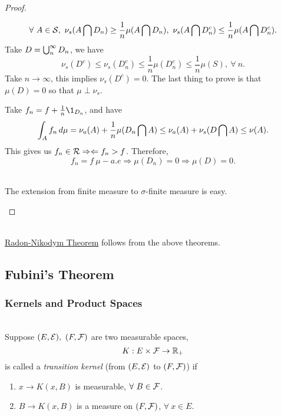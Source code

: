 \begin{proof}
\begin{enumerate}
    \begin{equation*}
        \forall\ A \in \mathcal{S},\ \nu_s(A \bigcap D_n) \geq \frac{1}{n} \mu(A \bigcap D_n),\ \nu_s(A \bigcap D_n^c) \leq \frac{1}{n} \mu(A \bigcap D_n^c).
    \end{equation*}
    Take $D = \bigcup_{n}^{\infty} D_n$, we have
    \begin{equation*}
        \nu_s(D^c) \leq \nu_s(D_n^c) \leq \frac{1}{n} \mu(D_n^c) \leq \frac{1}{n} \mu(S),\ \forall\ n.
    \end{equation*}
    Take $n \to \infty$, this implies $\nu_s(D^c) = 0$. The last thing to prove is that \underline{$\mu(D) = 0$} so that $\mu \perp \nu_s$.
    
    \np Take $f_n = f + \frac{1}{n} \1_{D_n}$, and have
    \begin{equation*}
        \int_A f_n \,d\mu = \nu_a(A) + \frac1n\mu(D_n \bigcap A) \leq \nu_a(A) + \nu_s (D \bigcap A) \leq \nu(A).
    \end{equation*}
    This gives us $f_n \in \mathcal{R} \Rightarrow \Leftarrow f_n > f$. Therefore, 
    \begin{equation*}
        f_n = f\ \mu-a.e \Rightarrow \mu(D_n) = 0 \Rightarrow \mu(D) = 0.
    \end{equation*}
\end{enumerate}
\begin{remark}\ \\
The extension from finite measure to $\sigma$-finite measure is easy.
\end{remark}
\end{proof}


\begin{remark}\ \\
\hyperref[R-N thm]{Radon-Nikodym Theorem} follows from the above theorems.
\end{remark}



\clearpage
\subsection{Fubini's Theorem}
\subsubsection{Kernels and Product Spaces}

\begin{definition}\ \\
Suppose $(E,\mathcal{E}),\ (F,\mathcal{F})$ are two measurable spaces, 
\begin{equation*}
    K: E \times \mathcal{F} \to \mathbb{R}_+
\end{equation*}
is called a \textit{transition kernel} (from $(E,\mathcal{E})$ to $(F,\mathcal{F})$) if 
\begin{enumerate}[label = (\arabic*)]
    \item $x \to K(x, B)$ is measurable, $\forall\ B \in \mathcal{F}$.
    \item $B \to K(x, B)$ is a measure on $(F,\mathcal{F})$, $\forall\ x \in E$.
\end{enumerate}
\end{definition}

